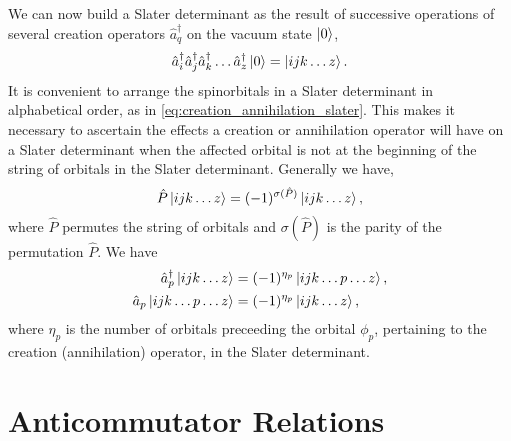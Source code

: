     We can now build a Slater determinant as the result of successive operations of
    several creation operators $\hat{a}_q^\dagger$ on the vacuum state $\ket{0}$,
    \begin{equation}
        \label{eq:creation_annihilation_slater}
        \hat{a}^\dagger_i \hat{a}^\dagger_j \hat{a}^\dagger_k \dots \hat{a}^\dagger_z
        \ket{0} = \ket{ijk \dots z}.
    \end{equation}
    It is convenient to arrange the spinorbitals in a Slater determinant in
    alphabetical order, as in \autoref{eq:creation_annihilation_slater}. This 
    makes it necessary to ascertain the effects a creation or annihilation
    operator will have on a Slater determinant when the affected orbital is
    not at the beginning of the string of orbitals in the Slater determinant.
    Generally we have,
    \begin{equation}
        \hat{P} \ket{ijk \dots z} = (-1)^{\sigma(\hat{P})} \ket{ijk \dots z},
    \end{equation}
    where $\hat{P}$ permutes the string of orbitals and $\sigma(\hat{P})$ is the
    parity of the permutation $\hat{P}$. We have
    \begin{align}
        \hat{a}_p^\dagger \ket{ijk \dots z} &= 
            (-1)^{\eta_p} \ket{ijk \dots p \dots z}, \\
        \hat{a}_p \ket{ijk \dots p \dots z} &=
            (-1)^{\eta_p} \ket{ijk \dots z},
    \end{align}
    where $\eta_p$ is the number of orbitals preceeding the orbital $\phi_p$, pertaining
    to the creation (annihilation) operator, in the Slater determinant.

\section{Anticommutator Relations}

